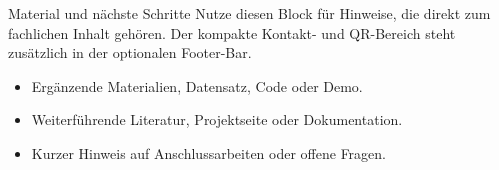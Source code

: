 \begin{PosterBlock}{Material und nächste Schritte}
\justifying
Nutze diesen Block für Hinweise, die direkt zum fachlichen Inhalt gehören. Der kompakte Kontakt- und QR-Bereich steht zusätzlich in der optionalen Footer-Bar.

\vspace{5mm}
\begin{itemize}
  \item Ergänzende Materialien, Datensatz, Code oder Demo.
  \item Weiterführende Literatur, Projektseite oder Dokumentation.
  \item Kurzer Hinweis auf Anschlussarbeiten oder offene Fragen.
\end{itemize}

\vspace{4mm}
\end{PosterBlock}
